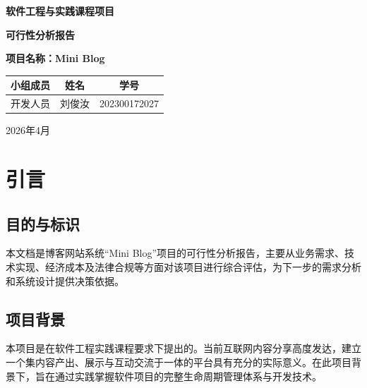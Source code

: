 \documentclass[12pt, a4paper]{ctexart}
\begin{document}
\begin{titlepage}
    \centering
    \vspace*{2cm}
    
    {\Huge \bfseries 软件工程与实践课程项目 \par}
    \vspace{1.5cm}
    
    {\Huge \bfseries 可行性分析报告 \par}
    \vspace{2cm}
    
    {\Huge \bfseries 项目名称：Mini Blog \par}
    \vspace{4cm}
    
    \Large
    \renewcommand{\arraystretch}{1.5}
    \begin{tabular}{|c|c|c|}
        \hline
        \textbf{小组成员} & \textbf{姓名} & \textbf{学号} \\
        \hline
        开发人员 & 刘俊汝 & 202300172027 \\
        \hline
    \end{tabular}
    
    \vfill
    
    {\Large 2026年4月 \par}
\end{titlepage}

\setcounter{page}{1} %
\tableofcontents
\newpage

\section{引言}
\subsection{目的与标识}
本文档是博客网站系统“Mini Blog”项目的可行性分析报告，主要从业务需求、技术实现、经济成本及法律合规等方面对该项目进行综合评估，为下一步的需求分析和系统设计提供决策依据。

\subsection{项目背景}
本项目是在软件工程实践课程要求下提出的。当前互联网内容分享高度发达，建立一个集内容产出、展示与互动交流于一体的平台具有充分的实际意义。在此项目背景下，旨在通过实践掌握软件项目的完整生命周期管理体系与开发技术。
\end{document}

